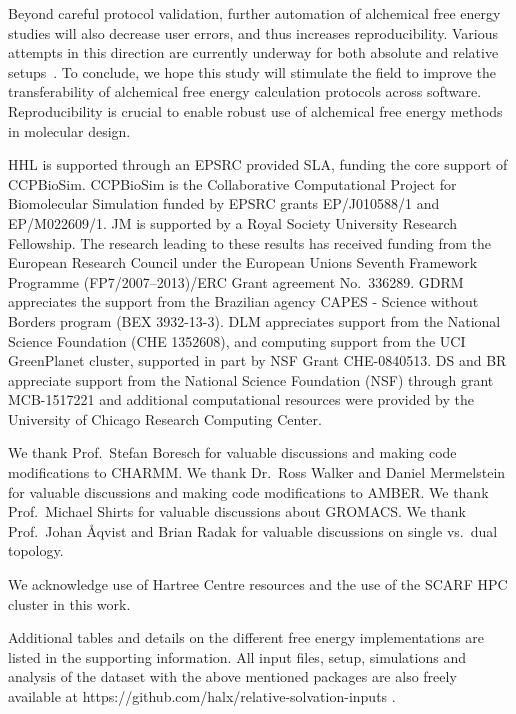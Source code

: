 \documentclass[journal=jctcce,manuscript=article]{achemso}
\begin{document}
 Beyond careful protocol validation,  further automation of alchemical free energy studies will also decrease user errors, and thus increases  reproducibility.  Various attempts in
this direction are currently underway for both absolute and relative
setups~\cite{christ_accuracy_2013, JCC:JCC23804, Liu2013,
doi:10.1021/jp505332p, doi:10.1021/acs.jcim.6b00162,
doi:10.1021/acs.jctc.6b00979,loeffler_fesetup:_2015}. To conclude, we hope this study will stimulate the field to improve the transferability of alchemical free energy calculation protocols across software.  Reproducibility is crucial to enable robust use of alchemical free energy methods in molecular design.


\begin{acknowledgement}
  HHL is supported through an EPSRC provided SLA, funding the core
  support of CCPBioSim.  CCPBioSim is the Collaborative Computational
  Project for Biomolecular Simulation funded by EPSRC grants
  EP/J010588/1 and EP/M022609/1.  JM is supported by a Royal Society
  University Research Fellowship.  The research leading to these
  results has received funding from the European Research Council
  under the European Unions Seventh Framework Programme
  (FP7/2007--2013)/ERC Grant agreement No.\ 336289.  GDRM appreciates
  the support from the Brazilian agency CAPES - Science without
  Borders program (BEX 3932-13-3).  DLM appreciates support from the
  National Science Foundation (CHE 1352608), and computing support
  from the UCI GreenPlanet cluster, supported in part by NSF Grant
  CHE-0840513. DS and BR appreciate support from the National Science Foundation (NSF) through grant MCB-1517221 and additional computational resources were provided by the University of Chicago Research Computing Center.


  We thank Prof.\ Stefan Boresch for valuable discussions and making code
  modifications to CHARMM.  We thank Dr.\ Ross Walker and Daniel Mermelstein
  for valuable discussions and making code modifications to AMBER.  We thank
  Prof.\ Michael Shirts for valuable discussions about GROMACS.  We thank
  Prof.\ Johan \AA{}qvist and Brian Radak for valuable discussions on single
  vs.\ dual topology.

  We acknowledge use of Hartree Centre resources and the use of the
  SCARF HPC cluster in this work.
\end{acknowledgement}

\begin{suppinfo}
Additional tables and details on the different free energy
implementations are listed in the supporting information.  All input
files, setup, simulations and analysis of the dataset with the above
mentioned packages are also freely available at
https://github.com/halx/relative-solvation-inputs .

\end{suppinfo}


\end{document}
